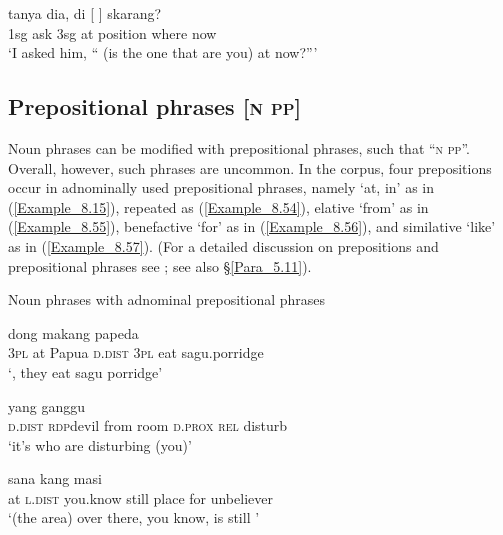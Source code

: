 \ea
\label{Example_8.53}
 {tanya} {dia,} {di} {[} {]} {skarang?}\\ %
 1sg  ask  3sg  at  position  where  now\\
\glt
‘I asked him, `` (is the one that are you) at now?''' \textstyleExampleSource{[081011-008-Cv.0023]}
\z


\subsection{Prepositional phrases [\textsc{n} \textsc{pp}]}
\label{Para_8.2.7}
Noun phrases can be modified with prepositional phrases, such that ``\textsc{n} \textsc{pp}''. Overall, however, such  phrases are uncommon. In the corpus, four prepositions occur in adnominally used prepositional phrases, namely   ‘at, in’ as in (\ref{Example_8.15}), repeated as (\ref{Example_8.54}), elative  ‘from’ as in (\ref{Example_8.55}), benefactive  ‘for’ as in (\ref{Example_8.56}), and similative  ‘like’ as in (\ref{Example_8.57}). (For a detailed discussion on prepositions and prepositional phrases see ; see also §\ref{Para_5.11}).



\begin{styleExampleTitle}
Noun phrases with adnominal prepositional phrases
\end{styleExampleTitle}
\ea
\label{Example_8.54}
 {} {} {} {dong} {makang} {papeda}\\ %
 \textsc{3pl}  at  Papua  \textsc{d.dist}  \textsc{3pl}  eat  sagu.porridge\\
\glt 
‘, they eat sagu porridge’ \textstyleExampleSource{[081109-009-JR.0001]}
\z

\ea
\label{Example_8.55}
 {} {} {} {} {yang} {ganggu}\\ %
 \textsc{d.dist}  \textsc{rdp}{\Tilde}devil  from  room  \textsc{d.prox}  \textsc{rel}  disturb\\
\glt 
‘it’s  who are disturbing (you)’ \textstyleExampleSource{[081011-008-CvPh.0018]}
\z

\ea
\label{Example_8.56}
 {sana} {kang} {masi} {} {} {}\\ %
 at  \textsc{l.dist}  you.know  still  place  for  unbeliever\\
\glt 
‘(the area) over there, you know, is still ’ \textstyleExampleSource{[081011-022-Cv.0238]}
\z

